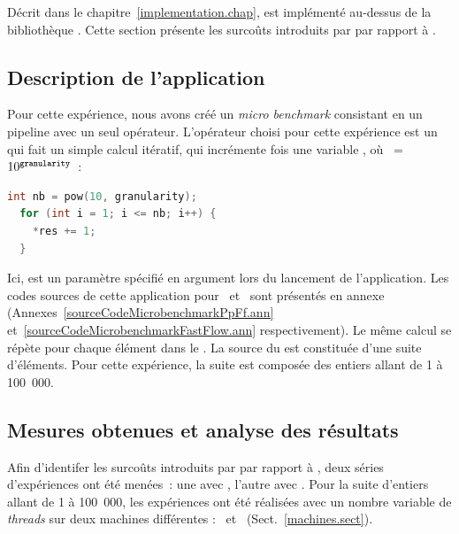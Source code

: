 
D\'ecrit dans le chapitre~\ref{implementation.chap},  est impl\'ement\'e au-dessus de la biblioth\`eque . Cette section pr\'esente les surco\^uts introduits par  par rapport \`a . 


\subsection{Description de l'application}

Pour cette exp\'erience, nous avons cr\'e\'e un \emph{micro benchmark} consistant en un {pipeline} avec un seul op\'erateur. L'op\'erateur choisi pour cette exp\'erience est un  qui fait un simple calcul it\'eratif, qui incr\'emente   fois une variable , o\`u ~=~$10^{{\tt granularity}}$~:
{
\begin{lstlisting}[language=c++]
  int nb = pow(10, granularity);
  for (int i = 1; i <= nb; i++) {
    *res += 1;   
  }
\end{lstlisting}
} 

Ici,  est un param\`etre sp\'ecifi\'e en argument lors du lancement de l'application. Les codes sources de cette application pour~ et~ sont pr\'esent\'es en annexe (Annexes~\ref{sourceCodeMicrobenchmarkPpFf.ann} et~\ref{sourceCodeMicrobenchmarkFastFlow.ann} respectivement). Le m\^eme calcul se r\'ep\`ete pour chaque \'el\'ement dans le . La source du  est constitu\'ee d'une suite d'\'el\'ements. Pour cette exp\'erience, la suite est compos\'ee des entiers allant de 1 \`a 100~000.  


\subsection{Mesures obtenues et analyse des r\'esultats}

Afin d'identifer les surco\^uts introduits par \PpFf{} par rapport \`a , deux s\'eries d'exp\'eriences ont \'et\'e men\'ees~: une avec , l'autre avec . Pour la suite d'entiers allant de 1 \`a 100~000, les exp\'eriences ont \'et\'e r\'ealis\'ees avec un nombre variable de \emph{threads} sur deux machines diff\'erentes : \ et \ (Sect.~\ref{machines.sect}).  


